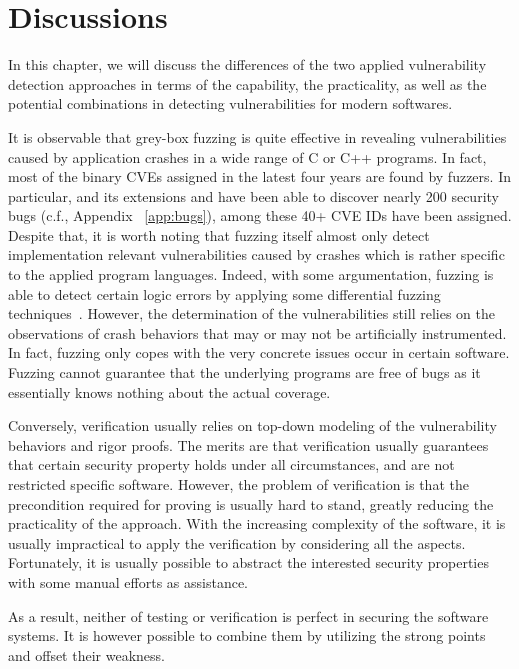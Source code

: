 
\chapter{Discussions} \label{ch:discuss}
In this chapter, we will discuss the differences of the two applied vulnerability detection approaches in terms of the capability, the practicality, as well as the potential combinations in detecting vulnerabilities for modern softwares.

It is observable that grey-box fuzzing is quite effective in revealing vulnerabilities caused by application crashes in a wide range of C or C++ programs. In fact, most of the binary CVEs assigned in the latest four years are found by fuzzers. In particular, \FOT and its extensions \dFOT and \mtfuzz have been able to discover nearly 200 security bugs (c.f., Appendix ~\ref{app:bugs}), among these 40+ CVE IDs have been assigned. Despite that, it is worth noting that fuzzing itself almost only detect implementation relevant vulnerabilities caused by crashes which is rather specific to the applied program languages. Indeed, with some argumentation, fuzzing is able to detect certain logic errors by applying some differential fuzzing techniques~\cite{nezha}. However, the determination of the vulnerabilities still relies on the observations of crash behaviors that may or may not be artificially instrumented. In fact, fuzzing only copes with the very concrete issues occur in certain software. Fuzzing cannot guarantee that the underlying programs are free of bugs as it essentially knows nothing about the actual coverage.

Conversely, verification usually relies on top-down modeling of the vulnerability behaviors and rigor proofs. The merits are that verification usually guarantees that certain security property holds under all circumstances, and are not restricted specific software. However, the problem of verification is that the precondition required for proving is usually hard to stand, greatly reducing the practicality of the approach. With the increasing complexity of the software, it is usually impractical to apply the verification by considering all the aspects. Fortunately, it is usually possible to abstract the interested security properties with some manual efforts as assistance.

As a result, neither of testing or verification is perfect in securing the software systems. It is however possible to combine them by utilizing the strong points and offset their weakness.